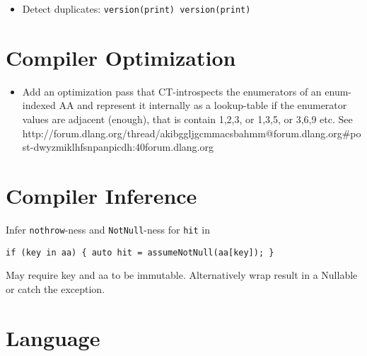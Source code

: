 \documentclass[xcolor=dvipsnames, twocolumn]{article}
\begin{document}
\begin{itemize}
\item Detect duplicates: \texttt{version(print) version(print)}
\end{itemize}

\section{Compiler Optimization}

\begin{itemize}
\item Add an optimization pass that CT-introspects the enumerators of an
  enum-indexed AA and represent it internally as a lookup-table if the
  enumerator values are adjacent (enough), that is contain 1,2,3, or 1,3,5, or
  3,6,9 etc. See http://forum.dlang.org/thread/akibggljgcmmacsbahmm@forum.dlang.org#post-dwyzmiklhfsnpanpicdh:40forum.dlang.org
\end{itemize}

\section{Compiler Inference}

\item Infer \texttt{nothrow}-ness and \texttt{NotNull}-ness for \texttt{hit} in
\begin{lstlisting}[frame=single]
if (key in aa) { auto hit = assumeNotNull(aa[key]); }
\end{lstlisting}
May require key and aa to be immutable. Alternatively wrap result in a Nullable
or catch the exception.

\section{Language}
\end{document}
